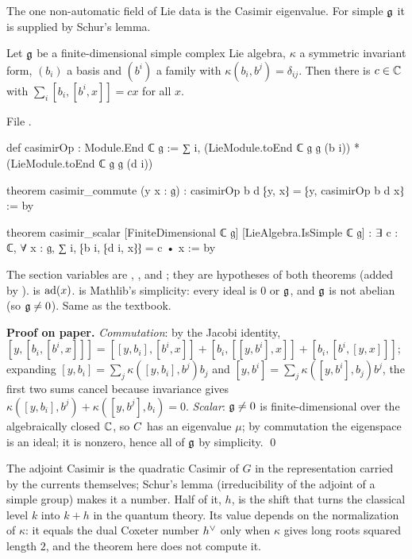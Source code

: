 The one non-automatic field of Lie data is the Casimir eigenvalue. For simple $\mathfrak g$ it is supplied by Schur's lemma.

\begin{theorem}\label{l23:thm:casimir}
Let $\mathfrak g$ be a finite-dimensional simple complex Lie algebra, $\kappa$ a symmetric invariant form, $(b_i)$ a basis and
$(b^i)$ a family with $\kappa(b_i,b^j)=\delta_{ij}$. Then there is $c\in{\mathbb{C}}$ with $\sum_i[b_i,[b^i,x]]=cx$ for all $x$.
\end{theorem}
\noindent File .
\begin{leancode}
def casimirOp : Module.End ℂ 𝔤 :=
  ∑ i, (LieModule.toEnd ℂ 𝔤 𝔤 (b i)) * (LieModule.toEnd ℂ 𝔤 𝔤 (d i))

theorem casimir_commute (y x : 𝔤) : casimirOp b d ⁅y, x⁆ = ⁅y, casimirOp b d x⁆ := by

theorem casimir_scalar [FiniteDimensional ℂ 𝔤] [LieAlgebra.IsSimple ℂ 𝔤] :
    ∃ c : ℂ, ∀ x : 𝔤, ∑ i, ⁅b i, ⁅d i, x⁆⁆ = c • x := by
\end{leancode}

\begin{dictionary}
The section variables are , ,  and
; they are hypotheses of both theorems (added by
).  is $\operatorname{ad}(x)$.  is Mathlib's
simplicity: every ideal is $0$ or $\mathfrak g$, and $\mathfrak g$ is not abelian (so $\mathfrak g\ne0$). Same as the textbook.
\end{dictionary}

\textbf{Proof on paper.} \emph{Commutation}: by the Jacobi identity,
$[y,[b_i,[b^i,x]]]=[[y,b_i],[b^i,x]]+[b_i,[[y,b^i],x]]+[b_i,[b^i,[y,x]]]$; expanding $[y,b_i]=\sum_j\kappa([y,b_i],b^j)b_j$ and
$[y,b^i]=\sum_j\kappa([y,b^i],b_j)b^j$, the first two sums cancel because invariance gives
$\kappa([y,b_i],b^j)+\kappa([y,b^j],b_i)=0$. \emph{Scalar}: $\mathfrak g\ne0$ is finite-dimensional over the algebraically
closed ${\mathbb{C}}$, so $C$ has an eigenvalue $\mu$; by commutation the eigenspace is an ideal; it is nonzero, hence all of
$\mathfrak g$ by simplicity. \qed

\begin{physics}
The adjoint Casimir is the quadratic Casimir of $G$ in the representation carried by the currents themselves; Schur's
lemma (irreducibility of the adjoint of a simple group) makes it a number. Half of it, $h$, is the shift that turns the
classical level $k$ into $k+h$ in the quantum theory. Its value depends on the normalization of $\kappa$: it equals the dual
Coxeter number $h^\vee$ only when $\kappa$ gives long roots squared length $2$, and the theorem here does not compute it.
\end{physics}

